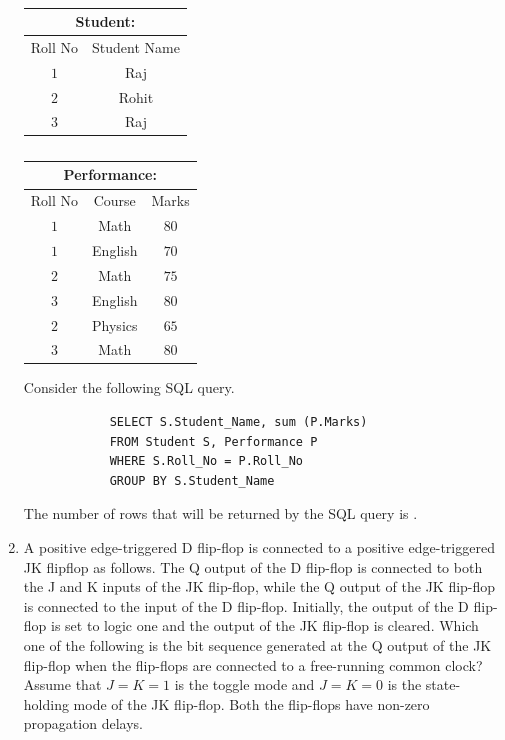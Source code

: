\documentclass[journal,12pt,onecolumn]{IEEEtran}
\theoremstyle{remark}
\begin{document}
\begin{enumerate}[resume]
		\begin{table}[h]
			\caption*{}
			\label{tab:student_performance}
			\begin{center}
				\begin{tabular}{|c|c|}
					\hline
					\multicolumn{2}{|c|}{Student:} \\
					\hline
					Roll No & Student Name \\
					\hline
					$1$ & Raj \\
					\hline
					$2$ & Rohit \\
					\hline
					$3$ & Raj \\
					\hline
				\end{tabular}
				\quad
				\begin{tabular}{|c|c|c|}
					\hline
					\multicolumn{3}{|c|}{Performance:} \\
					\hline
					Roll No & Course & Marks \\
					\hline
					$1$ & Math & $80$ \\
					\hline
					$1$ & English & $70$ \\
					\hline
					$2$ & Math & $75$ \\
					\hline
					$3$ & English & $80$ \\
					\hline
					$2$ & Physics & $65$ \\
					\hline
					$3$ & Math & $80$ \\
					\hline
				\end{tabular}
			\end{center}
		\end{table}
		
		Consider the following SQL query.
		\begin{verbatim}
			SELECT S.Student_Name, sum (P.Marks)
			FROM Student S, Performance P
			WHERE S.Roll_No = P.Roll_No
			GROUP BY S.Student_Name
		\end{verbatim}
		
		The number of rows that will be returned by the SQL query is \underline{\hspace{2cm}}.
		
		\hfill{}
		
		\item A positive edge-triggered D flip-flop is connected to a positive edge-triggered JK flipflop as follows. The Q output of the D flip-flop is connected to both the J and K inputs of the JK flip-flop, while the Q output of the JK flip-flop is connected to the input of the D flip-flop. Initially, the output of the D flip-flop is set to logic one and the output of the JK flip-flop is cleared. Which one of the following is the bit sequence  generated at the Q output of the JK flip-flop when the flip-flops are connected to a free-running common clock? Assume that $J = K = 1$ is the toggle mode and $J = K = 0$ is the state-holding mode of the JK flip-flop. Both the flip-flops have non-zero propagation delays.
		

\end{enumerate}
\end{document}
